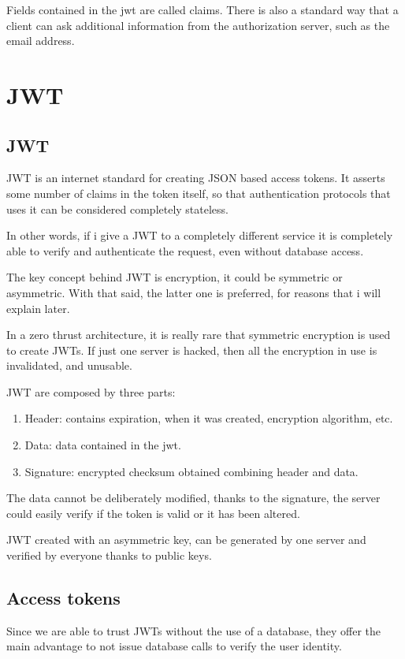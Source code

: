 \documentclass[20pt]{style}
\begin{document}
Fields contained in the jwt are called claims.
There is also a standard way that a client can ask additional information from the
authorization server, such as the email address.
\section{JWT}
\label{jwt}
\subsection{JWT}
JWT is an internet standard for creating JSON based access tokens. It asserts
some number of claims in the token itself, so that authentication protocols that
uses it can be considered completely stateless.

In other words, if i give a JWT to a completely different service
it is completely able to verify and authenticate the request, even without
database access.

The key concept behind JWT is encryption, it could be symmetric or asymmetric.
With that said, the latter one is preferred, for reasons that i will explain
later.

In a zero thrust architecture, it is really rare that symmetric encryption is
used to create JWTs. If just one server is hacked, then all the encryption in
use is invalidated, and unusable.

JWT are composed by three  parts:

\begin{enumerate}
    \item Header: contains expiration, when it was created, encryption
        algorithm, etc.
    \item Data: data contained in the jwt.
    \item Signature: encrypted checksum obtained combining header and data.
\end{enumerate}

The data cannot be deliberately modified, thanks to the signature, the server
could easily verify if the token is valid or it has been altered.

JWT created with an asymmetric key, can be generated by one server and verified
by everyone thanks to public keys.

\subsection{Access tokens}
Since we are able to trust JWTs  without the use of a database, they offer the
main advantage to not issue database calls to verify the user identity.
\end{document}
